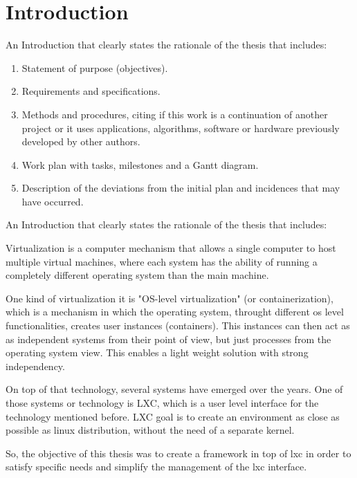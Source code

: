 \clearpage\section{Introduction}

An Introduction that clearly states the rationale of the thesis that includes:

\begin{enumerate} \item {Statement of purpose (objectives).}
\item {Requirements and specifications.}
\item {Methods and procedures, citing if this work is a continuation of another project or it uses applications, algorithms,
software or hardware previously developed by other authors.}
\item {Work plan with tasks, milestones and a Gantt diagram.}

\item {Description of the deviations from the initial plan and incidences that may have occurred. }
\end{enumerate}

An Introduction that clearly states the rationale of the thesis that includes:

\bigskip

Virtualization is a computer mechanism that allows a single computer to host multiple virtual machines, where each system has the ability of running a completely different operating system than the main machine. 

One kind of virtualization it is "OS-level virtualization" (or containerization), which is a mechanism in which the operating system, throught different os level functionalities, creates user instances (containers). This instances can then act as as independent systems from their point of view, but just processes from the operating system view. This enables a light weight solution with strong independency.

On top of that technology, several systems have emerged over the years. One of those systems or technology is LXC, which is a user level interface for the technology mentioned before. LXC goal is to create an environment as close as possible as linux distribution, without the need of a separate kernel.

So, the objective of this thesis was to create a framework in top of lxc in order to satisfy specific needs and simplify the management of the lxc interface.

